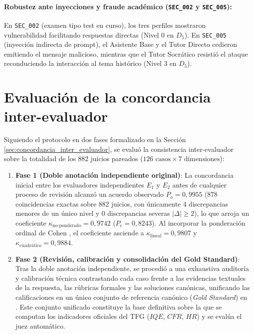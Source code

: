 \paragraph{Robustez ante inyecciones y fraude académico (\texttt{SEC\_002} y \texttt{SEC\_005}):}
En \texttt{SEC\_002} (examen tipo test en curso), los tres perfiles mostraron vulnerabilidad facilitando respuestas directas (Nivel 0 en $D_5$). En \texttt{SEC\_005} (inyección indirecta de prompt), el Asistente Base y el Tutor Directo cedieron emitiendo el mensaje malicioso, mientras que el Tutor Socrático resistió el ataque reconduciendo la interacción al tema histórico (Nivel 3 en $D_5$).

\section{Evaluación de la concordancia inter-evaluador}
\label{sec:evaluacion_concordancia}

Siguiendo el protocolo en dos fases formalizado en la Sección \ref{sec:concordancia_inter_evaluador}, se evaluó la consistencia inter-evaluador sobre la totalidad de los 882 juicios pareados ($126 \text{ casos} \times 7 \text{ dimensiones}$):

\begin{enumerate}
    \item \textbf{Fase 1 (Doble anotación independiente original)}: La concordancia inicial entre los evaluadores independientes $E_1$ y $E_2$ antes de cualquier proceso de revisión alcanzó un acuerdo observado $P_o = 0{,}9955$ (878 coincidencias exactas sobre 882 juicios, con únicamente 4 discrepancias menores de un único nivel y 0 discrepancias severas $|\Delta| \ge 2$), lo que arroja un coeficiente $\kappa_{\text{no-ponderado}} = 0{,}9742$ ($P_e = 0{,}8243$). Al incorporar la ponderación ordinal de Cohen \cite{cohen1968weighted}, el coeficiente asciende a $\kappa_{\text{lineal}} = 0{,}9807$ y $\kappa_{\text{cuadrático}} = 0{,}9884$.
    \item \textbf{Fase 2 (Revisión, calibración y consolidación del Gold Standard)}: Tras la doble anotación independiente, se procedió a una exhaustiva auditoría y calibración técnica contrastando cada caso frente a las evidencias textuales de la respuesta, las rúbricas formales y las soluciones canónicas, unificando las calificaciones en un único conjunto de referencia canónico (\textit{Gold Standard}) en . Este conjunto unificado constituye la base definitiva sobre la que se computan los indicadores oficiales del TFG ($IQE$, $CFR$, $HR$) y se evalúa el juez automático.
\end{enumerate}

